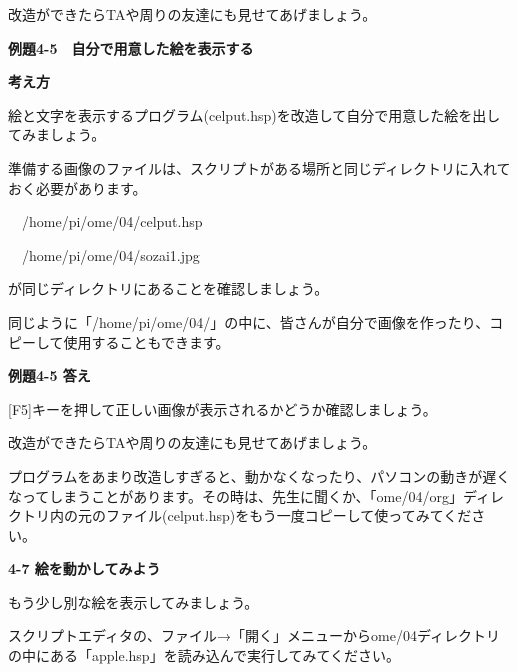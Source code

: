 \documentclass[a4paper,dvipdfmx]{jarticle}
\begin{document}
改造ができたらTAや周りの友達にも見せてあげましょう。


\bigskip


\bigskip


\bigskip


\bigskip


\bigskip

{\bfseries
例題4-5　自分で用意した絵を表示する}


\bigskip

{\bfseries
考え方}


\bigskip

絵と文字を表示するプログラム(celput.hsp)を改造して自分で用意した絵を出してみましょう。

準備する画像のファイルは、スクリプトがある場所と同じディレクトリに入れておく必要があります。


\bigskip

\ \ /home/pi/ome/04/celput.hsp

\ \ /home/pi/ome/04/sozai1.jpg


\bigskip

が同じディレクトリにあることを確認しましょう。

同じように「/home/pi/ome/04/」の中に、皆さんが自分で画像を作ったり、コピーして使用することもできます。


\bigskip


\bigskip


\bigskip


\bigskip

{\bfseries
例題4-5 答え}


\bigskip

[F5]キーを押して正しい画像が表示されるかどうか確認しましょう。

改造ができたらTAや周りの友達にも見せてあげましょう。


\bigskip

プログラムをあまり改造しすぎると、動かなくなったり、パソコンの動きが遅くなってしまうことがあります。その時は、先生に聞くか、「ome/04/org」ディレクトリ内の元のファイル(celput.hsp)をもう一度コピーして使ってみてください。


\bigskip


\bigskip

\clearpage
\bigskip

{\bfseries
4-7 絵を動かしてみよう}


\bigskip

もう少し別な絵を表示してみましょう。

スクリプトエディタの、ファイル→「開く」メニューからome/04ディレクトリの中にある「apple.hsp」を読み込んで実行してみてください。
\end{document}
